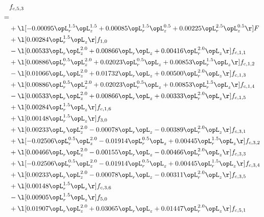 \begin{alignat}{2} 
\label{eq:f_53_1} 
& f_{c,5,3} \nonumber \\ 
 = \\ 
& + \l[  -0.00095 \opL_r^{1.5} \opL_z^{1.5} +  0.00085 \opL_r^{1.5} \opL_z^{0.5} +  0.00225 \opL_r^{2.5} \opL_z^{0.5}  \r] F \nonumber \\ 
& + \l[  0.00284 \opL_r^{1.5} \opL_z  \r] f_{1,0} \nonumber \\ 
& - \l[  0.00533 \opL_r \opL_z^{2.0} +  0.00866 \opL_r \opL_z +  0.00416 \opL_r^{2.0} \opL_z  \r] f_{c,1,1} \nonumber \\ 
& + \l[  0.00886 \opL_r^{0.5} \opL_z^{2.0} +  0.02023 \opL_r^{0.5} \opL_z +  0.00853 \opL_r^{1.5} \opL_z  \r] f_{c,1,2} \nonumber \\ 
& - \l[  0.01066 \opL_r \opL_z^{2.0} +  0.01732 \opL_r \opL_z +  0.00500 \opL_r^{2.0} \opL_z  \r] f_{c,1,3} \nonumber \\ 
& + \l[  0.00886 \opL_r^{0.5} \opL_z^{2.0} +  0.02023 \opL_r^{0.5} \opL_z +  0.00853 \opL_r^{1.5} \opL_z  \r] f_{c,1,4} \nonumber \\ 
& - \l[  0.00533 \opL_r \opL_z^{2.0} +  0.00866 \opL_r \opL_z +  0.00333 \opL_r^{2.0} \opL_z  \r] f_{c,1,5} \nonumber \\ 
& + \l[  0.00284 \opL_r^{1.5} \opL_z  \r] f_{c,1,6} \nonumber \\ 
& + \l[  0.00148 \opL_r^{1.5} \opL_z  \r] f_{3,0} \nonumber \\ 
& + \l[  0.00233 \opL_r \opL_z^{2.0}   -0.00078 \opL_r \opL_z   -0.00389 \opL_r^{2.0} \opL_z  \r] f_{c,3,1} \nonumber \\ 
& + \l[  -0.02506 \opL_r^{0.5} \opL_z^{2.0}   -0.01914 \opL_r^{0.5} \opL_z +  0.00445 \opL_r^{1.5} \opL_z  \r] f_{c,3,2} \nonumber \\ 
& + \l[  0.00466 \opL_r \opL_z^{2.0}   -0.00155 \opL_r \opL_z   -0.00466 \opL_r^{2.0} \opL_z  \r] f_{c,3,3} \nonumber \\ 
& + \l[  -0.02506 \opL_r^{0.5} \opL_z^{2.0}   -0.01914 \opL_r^{0.5} \opL_z +  0.00445 \opL_r^{1.5} \opL_z  \r] f_{c,3,4} \nonumber \\ 
& + \l[  0.00233 \opL_r \opL_z^{2.0}   -0.00078 \opL_r \opL_z   -0.00311 \opL_r^{2.0} \opL_z  \r] f_{c,3,5} \nonumber \\ 
& + \l[  0.00148 \opL_r^{1.5} \opL_z  \r] f_{c,3,6} \nonumber \\ 
& - \l[  0.00905 \opL_r^{1.5} \opL_z  \r] f_{5,0} \nonumber \\ 
& + \l[  0.01907 \opL_r \opL_z^{2.0} +  0.03065 \opL_r \opL_z +  0.01447 \opL_r^{2.0} \opL_z  \r] f_{c,5,1} \nonumber \\ 

\end{alignat}
